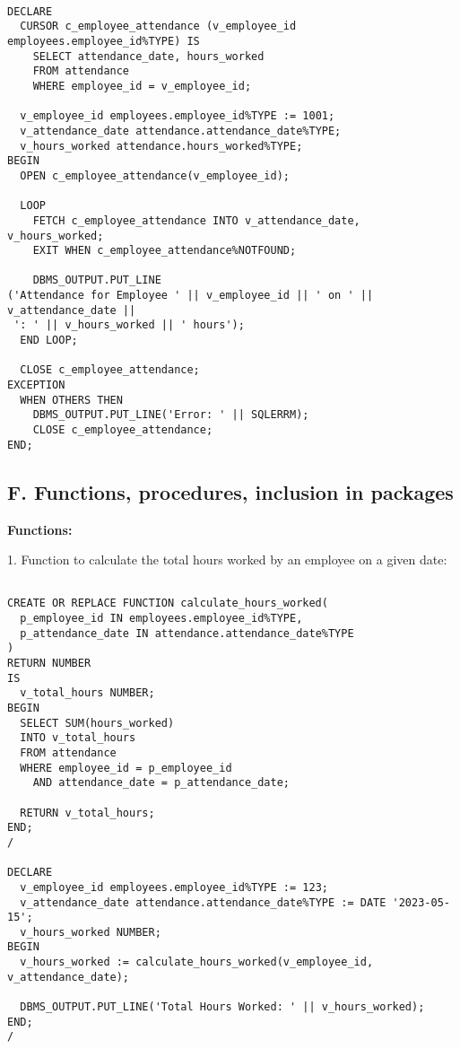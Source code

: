 \documentclass[11pt]{article} %
\begin{document}
\begin{small}
\begin{verbatim}

DECLARE
  CURSOR c_employee_attendance (v_employee_id employees.employee_id%TYPE) IS
    SELECT attendance_date, hours_worked
    FROM attendance
    WHERE employee_id = v_employee_id;
  
  v_employee_id employees.employee_id%TYPE := 1001;
  v_attendance_date attendance.attendance_date%TYPE;
  v_hours_worked attendance.hours_worked%TYPE;
BEGIN
  OPEN c_employee_attendance(v_employee_id);
  
  LOOP
    FETCH c_employee_attendance INTO v_attendance_date, v_hours_worked;
    EXIT WHEN c_employee_attendance%NOTFOUND;
    
    DBMS_OUTPUT.PUT_LINE
('Attendance for Employee ' || v_employee_id || ' on ' || v_attendance_date ||
 ': ' || v_hours_worked || ' hours');
  END LOOP;
  
  CLOSE c_employee_attendance;
EXCEPTION
  WHEN OTHERS THEN
    DBMS_OUTPUT.PUT_LINE('Error: ' || SQLERRM);
    CLOSE c_employee_attendance;
END;

\end{verbatim}
\end{small}

\subsection*{F. Functions, procedures, inclusion in packages }

\textbf{Functions:}

1. Function to calculate the total hours worked by an employee on a given date:

\begin{small}
\begin{verbatim}

CREATE OR REPLACE FUNCTION calculate_hours_worked(
  p_employee_id IN employees.employee_id%TYPE,
  p_attendance_date IN attendance.attendance_date%TYPE
)
RETURN NUMBER
IS
  v_total_hours NUMBER;
BEGIN
  SELECT SUM(hours_worked)
  INTO v_total_hours
  FROM attendance
  WHERE employee_id = p_employee_id
    AND attendance_date = p_attendance_date;

  RETURN v_total_hours;
END;
/

DECLARE
  v_employee_id employees.employee_id%TYPE := 123;
  v_attendance_date attendance.attendance_date%TYPE := DATE '2023-05-15';
  v_hours_worked NUMBER;
BEGIN
  v_hours_worked := calculate_hours_worked(v_employee_id, v_attendance_date);
  
  DBMS_OUTPUT.PUT_LINE('Total Hours Worked: ' || v_hours_worked);
END;
/

\end{verbatim}
\end{small}
\end{document}
